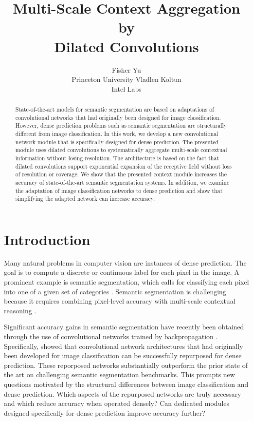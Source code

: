 \documentclass{article} %
\title{Multi-Scale Context Aggregation by\\Dilated Convolutions}
\author{Fisher Yu\\
Princeton University
\AND
Vladlen Koltun\\
Intel Labs
}
\begin{document}
\maketitle

\begin{abstract}
State-of-the-art models for semantic segmentation are based on adaptations of convolutional networks that had originally been designed for image classification. However, dense prediction problems such as semantic segmentation are structurally different from image classification. In this work, we develop a new convolutional network module that is specifically designed for dense prediction. The presented module uses dilated convolutions to systematically aggregate multi-scale contextual information without losing resolution. The architecture is based on the fact that dilated convolutions support exponential expansion of the receptive field without loss of resolution or coverage. We show that the presented context module increases the accuracy of state-of-the-art semantic segmentation systems. In addition, we examine the adaptation of image classification networks to dense prediction and show that simplifying the adapted network can increase accuracy.
\end{abstract}


\section{Introduction}

Many natural problems in computer vision are instances of dense prediction. The goal is to compute a discrete or continuous label for each pixel in the image. A prominent example is semantic segmentation, which calls for classifying each pixel into one of a given set of categories \citep{He2004,Shotton2009,Kohli2009,KrahenbuhlKoltun2011}. Semantic segmentation is challenging because it requires combining pixel-level accuracy with multi-scale contextual reasoning \citep{He2004,GalleguillosBelongie2010}.

Significant accuracy gains in semantic segmentation have recently been obtained through the use of convolutional networks \citep{LeCun1989} trained by backpropagation \citep{Rumelhart1986}.
Specifically, \cite{Long2015} showed that convolutional network architectures that had originally been developed for image classification can be successfully repurposed for dense prediction. These reporposed networks substantially outperform the prior state of the art on challenging semantic segmentation benchmarks.
This prompts new questions motivated by the structural differences between image classification and dense prediction.
Which aspects of the repurposed networks are truly necessary and which reduce accuracy when operated densely?
Can dedicated modules designed specifically for dense prediction improve accuracy further?
\end{document}

